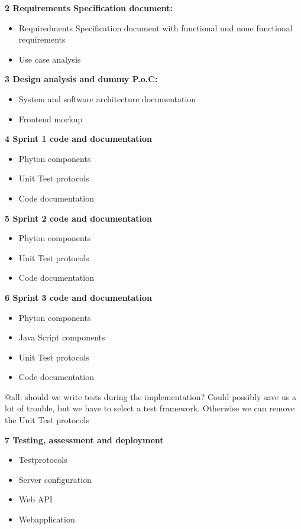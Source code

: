 \documentclass[notitlepage]{article}
\begin{document}
\begin{flushleft}
\textbf{2 Requirements Specification document:}
\\
\begin{itemize}
	\item Requiredments Specification document with functional und none functional requirements
	\item Use case analysis
\end{itemize}

\textbf{3 Design analysis and dummy P.o.C:}
\\
\begin{itemize}
	\item System and software architecture documentation
	\item Frontend mockup
\end{itemize}

\textbf{4 Sprint 1 code and documentation }
\\
\begin{itemize}
	\item Phyton components
	\item Unit Test protocols
	\item Code documentation
\end{itemize}

\textbf{5  Sprint 2 code and documentation }
\\
\begin{itemize}
	\item Phyton components
	\item Unit Test protocols
	\item Code documentation
\end{itemize}

\textbf{6 Sprint 3 code and documentation }
\\
\begin{itemize}
	\item Phyton components
	\item Java Script components
	\item Unit Test protocols
	\item Code documentation
\end{itemize}

{\color{red} @all: should we write tests during the implementation? Could possibly save us a lot of trouble, but we have to select a test framework.
Otherwise we can remove the Unit Test protocols
}

\textbf{7 Testing, assessment and deployment}
\\
\begin{itemize}
	\item Testprotocols
	\item Server configuration
	\item Web API 
	\item Webapplication
\end{itemize}


\end{flushleft}
\end{document}
